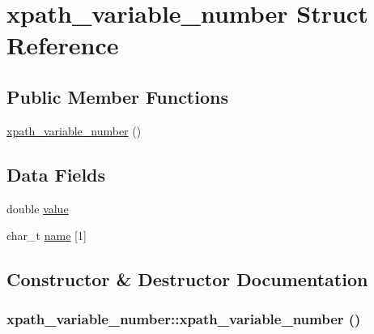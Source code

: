 \hypertarget{structxpath__variable__number}{
\section{xpath\_\-variable\_\-number Struct Reference}
\label{structxpath__variable__number}
}
\subsection*{Public Member Functions}
\begin{CompactItemize}
\item 
\hyperlink{structxpath__variable__number_e139f6cc348a1ccb0d1fe97039a2d077}{xpath\_\-variable\_\-number} ()
\end{CompactItemize}
\subsection*{Data Fields}
\begin{CompactItemize}
\item 
double \hyperlink{structxpath__variable__number_49949397348e7c941d88a694ec5c8e57}{value}
\item 
char\_\-t \hyperlink{structxpath__variable__number_2bf4163dab1a8e233d45677fee987f0f}{name} \mbox{[}1\mbox{]}
\end{CompactItemize}


\subsection{Constructor \& Destructor Documentation}
\hypertarget{structxpath__variable__number_e139f6cc348a1ccb0d1fe97039a2d077}{
\subsubsection[xpath\_\-variable\_\-number]{\setlength{\rightskip}{0pt plus 5cm}xpath\_\-variable\_\-number::xpath\_\-variable\_\-number ()}}
\label{structxpath__variable__number_e139f6cc348a1ccb0d1fe97039a2d077}





